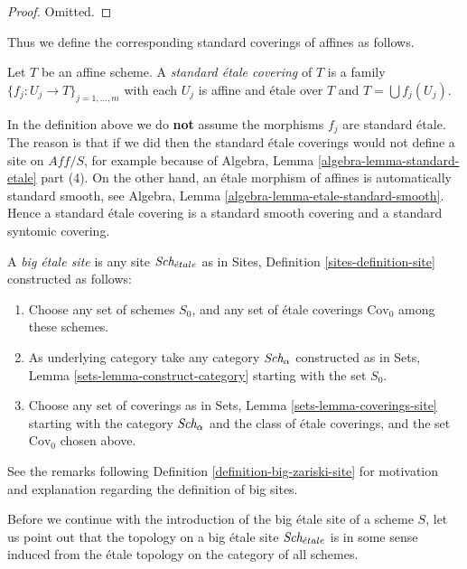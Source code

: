 \begin{proof}
Omitted.
\end{proof}

\noindent
Thus we define the corresponding standard coverings of affines as follows.

\begin{definition}
\label{definition-standard-etale}
Let $T$ be an affine scheme. A {\it standard \'etale covering}
of $T$ is a family $\{f_j : U_j \to T\}_{j = 1, \ldots, m}$
with each $U_j$ is affine and \'etale over $T$ and
$T = \bigcup f_j(U_j)$.
\end{definition}

\noindent
In the definition above we do {\bf not} assume the morphisms $f_j$ are
standard \'etale. The reason is that if we did then the standard \'etale
coverings would not define a site on $\textit{Aff}/S$, for example because of
Algebra, Lemma \ref{algebra-lemma-standard-etale} part (4).
On the other hand, an \'etale morphism of affines is automatically
standard smooth, see
Algebra, Lemma \ref{algebra-lemma-etale-standard-smooth}.
Hence a standard \'etale covering is a standard smooth
covering and a standard syntomic covering.

\begin{definition}
\label{definition-big-etale-site}
A {\it big \'etale site} is any site $\textit{Sch}_{\acute{e}tale}$ as in
Sites, Definition \ref{sites-definition-site} constructed as follows:
\begin{enumerate}
\item Choose any set of schemes $S_0$, and any set of \'etale coverings
$\text{Cov}_0$ among these schemes.
\item As underlying category take any category $\textit{Sch}_\alpha$
constructed as in Sets, Lemma \ref{sets-lemma-construct-category}
starting with the set $S_0$.
\item Choose any set of coverings as in
Sets, Lemma \ref{sets-lemma-coverings-site} starting with the
category $\textit{Sch}_\alpha$ and the class of \'etale coverings,
and the set $\text{Cov}_0$ chosen above.
\end{enumerate}
\end{definition}

\noindent
See the remarks following Definition \ref{definition-big-zariski-site}
for motivation and explanation regarding the definition of big sites.

\medskip\noindent
Before we continue with the introduction of the big \'etale site of
a scheme $S$, let us point out that the topology on a big \'etale site
$\textit{Sch}_{\acute{e}tale}$ is in some sense induced from the \'etale
topology on the category of all schemes.

